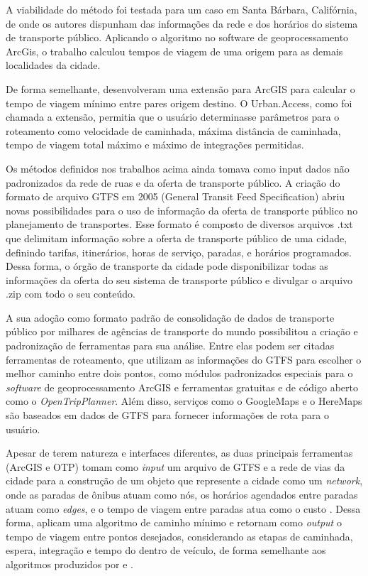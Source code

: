 \documentclass[        
    a4paper,          %
    12pt,             %
    chapter=TITLE,    %
    section=Title,    %
    subsection=Title, %
    oneside,          %
    english,          %
    spanish,          %
    brazil,           %
    fleqn             %
]{abntex2}
\begin{document}
  A viabilidade do método foi testada para um caso em Santa Bárbara, Califórnia, de onde os autores dispunham das informações da rede e dos horários do sistema de transporte público. Aplicando o algoritmo no software de geoprocessamento ArcGis, o trabalho calculou tempos de viagem de uma origem para as demais localidades da cidade.
  
  De forma semelhante, \citet{Benenson2010} desenvolveram uma extensão para ArcGIS para calcular o tempo de viagem mínimo entre pares origem destino. O Urban.Access, como foi chamada a extensão, permitia que o usuário determinasse parâmetros para o roteamento como velocidade de caminhada, máxima distância de caminhada, tempo de viagem total máximo e máximo de integrações permitidas.
  
  Os métodos definidos nos trabalhos acima ainda tomava como input dados não padronizados da rede de ruas e da oferta de transporte público. A criação do formato de arquivo GTFS em 2005 (General Transit Feed Specification) abriu novas possibilidades para o uso de informação da oferta de transporte público no planejamento de transportes. Esse formato é composto de diversos arquivos .txt que delimitam informação sobre a oferta de transporte público de uma cidade, definindo tarifas, itinerários, horas de serviço, paradas, e horários programados. Dessa forma, o órgão de transporte da cidade pode disponibilizar todas as informações da oferta do seu sistema de transporte público e divulgar o arquivo .zip com todo o seu conteúdo.
  
  A sua adoção como formato padrão de consolidação de dados de transporte público por milhares de agências de transporte do mundo possibilitou a criação e padronização de ferramentas para sua análise. Entre elas podem ser citadas ferramentas de roteamento, que utilizam as informações do GTFS para escolher o melhor caminho entre dois pontos, como módulos padronizados especiais para o \emph{software} de geoprocessamento ArcGIS e ferramentas gratuitas e de código aberto como o \emph{OpenTripPlanner}. Além disso, serviços como o GoogleMaps e o HereMaps são baseados em dados de GTFS para fornecer informações de rota para o usuário.
  
  Apesar de terem natureza e interfaces diferentes, as duas principais ferramentas (ArcGIS e OTP) tomam como \emph{input} um arquivo de GTFS e a rede de vias da cidade para a construção de um objeto que represente a cidade como um \emph{network}, onde as paradas de ônibus atuam como nós, os horários agendados entre paradas atuam como \emph{edges}, e o tempo de viagem entre paradas atua como o custo \citep{Wessel2017}. Dessa forma, aplicam uma algoritmo de caminho mínimo e retornam como \emph{output} o tempo de viagem entre pontos desejados, considerando as etapas de caminhada, espera, integração e tempo do dentro de veículo, de forma semelhante aos algoritmos produzidos por \citet{Lei2010} e \citet{Benenson2010}.
  
\end{document}
